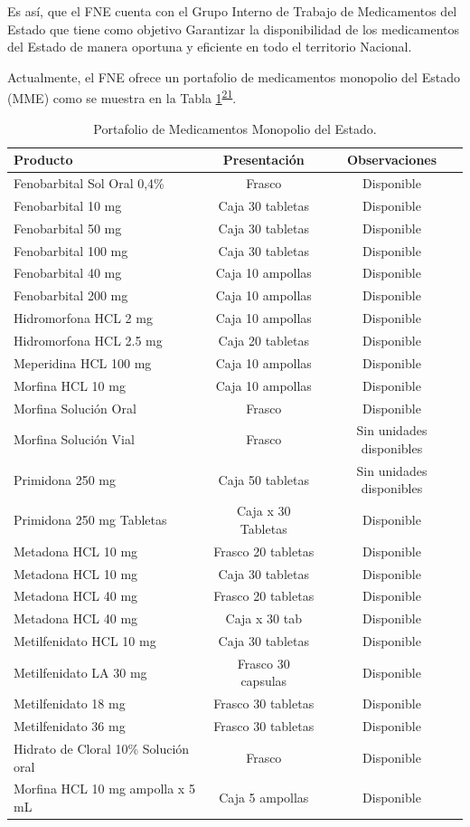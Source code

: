 \documentclass[
  oneside]{book}
\begin{document}
Es así, que el FNE cuenta con el Grupo Interno de Trabajo de Medicamentos del Estado que tiene como objetivo Garantizar la disponibilidad de los medicamentos del Estado de manera oportuna y eficiente en todo el territorio Nacional.

Actualmente, el FNE ofrece un portafolio de medicamentos monopolio del Estado (MME) como se muestra en la Tabla \ref{tab:portafolioMME}\textsuperscript{\protect\hyperlink{ref-ColombiaCompraEficiente2021}{21}}.

\begin{table}[!h]

\caption{\label{tab:portafolioMME}Portafolio de Medicamentos Monopolio del Estado.}
\centering
\begin{tabular}[t!]{lcc}
\toprule
Producto & Presentación & Observaciones\\
\midrule
Fenobarbital Sol Oral 0,4\% & Frasco & Disponible\\
Fenobarbital 10 mg & Caja 30 tabletas & Disponible\\
Fenobarbital 50 mg & Caja 30 tabletas & Disponible\\
Fenobarbital 100 mg & Caja 30 tabletas & Disponible\\
Fenobarbital 40 mg & Caja 10 ampollas & Disponible\\
\addlinespace
Fenobarbital 200 mg & Caja 10 ampollas & Disponible\\
Hidromorfona HCL 2 mg & Caja 10 ampollas & Disponible\\
Hidromorfona HCL 2.5 mg & Caja 20 tabletas & Disponible\\
Meperidina HCL 100 mg & Caja 10 ampollas & Disponible\\
Morfina HCL 10 mg & Caja 10 ampollas & Disponible\\
\addlinespace
Morfina Solución Oral & Frasco & Disponible\\
Morfina Solución Vial & Frasco & Sin unidades disponibles\\
Primidona 250 mg & Caja 50 tabletas & Sin unidades disponibles\\
Primidona 250 mg Tabletas & Caja x 30 Tabletas & Disponible\\
Metadona HCL 10 mg & Frasco 20 tabletas & Disponible\\
\addlinespace
Metadona HCL 10 mg & Caja 30 tabletas & Disponible\\
Metadona HCL 40 mg & Frasco 20 tabletas & Disponible\\
Metadona HCL 40 mg & Caja x 30 tab & Disponible\\
Metilfenidato HCL 10 mg & Caja 30 tabletas & Disponible\\
Metilfenidato LA 30 mg & Frasco 30 capsulas & Disponible\\
\addlinespace
Metilfenidato 18 mg & Frasco 30 tabletas & Disponible\\
Metilfenidato 36 mg & Frasco 30 tabletas & Disponible\\
Hidrato de Cloral 10\% Solución oral & Frasco & Disponible\\
Morfina HCL 10 mg ampolla x 5 mL & Caja 5 ampollas & Disponible\\
\bottomrule
\end{tabular}
\end{table}
\end{document}
